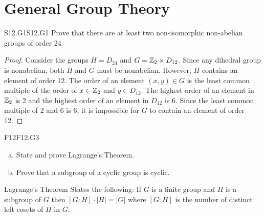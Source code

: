 \documentclass[../AlgebraQualSolutions.tex]{subfiles}
\begin{document}
\section{General Group Theory}
\begin{prob}{S12.G1}{S12.G1}
	Prove that there are at least two non-isomorphic non-abelian groups of order 24.
\end{prob}

\begin{proof}
	Consider the groups $H = D_{24}$ and $G = \mathbb{Z}_2 \times D_{12}$. Since any dihedral group is nonabelian, both $H$ and $G$ must be nonabelian. However, $H$ contains an element of order 12. The order of an element $(x,y) \in G$ is the least common multiple of the order of $x \in \mathbb{Z}_2$ and $y \in D_{12}$. The highest order of an element in $\mathbb{Z}_2$ is 2 and the highest order of an element in $D_{12}$ is 6. Since the least common multiple of 2 and 6 is 6, it is impossible for $G$ to contain an element of order 12.
\end{proof}

	\begin{prob}{F12}{F12.G3}
	\begin{enumerate}[(a)]
	\item State and prove Lagrange's Theorem.
	\item Prove that a subgroup of a cyclic group is cyclic.
	\end{enumerate}
	\end{prob}
	
	Lagrange's Theorem States the following: If $G$ is a finite group and $H$ is a subgroup of $G$ then $[G:H]\cdot|H| = |G|$ where $[G:H]$ is the number of distinct left cosets of $H$ in $G$.
\end{document}
